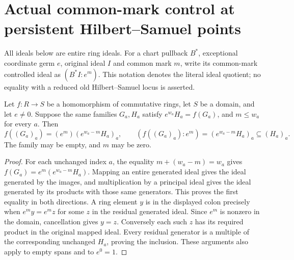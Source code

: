 \section{Actual common-mark control at persistent Hilbert--Samuel points}
\label{sec:hironaka-actual-common-mark-persistent-cosupport}
All ideals below are entire ring ideals. For a chart pullback $B^*$, exceptional coordinate germ $e$, original ideal $I$ and common mark $m$, write its common-mark controlled ideal as $(B^*I:e^m)$. This notation denotes the literal ideal quotient; no equality with a reduced old Hilbert--Samuel locus is asserted.

\begin{theorem}
\label{hir:actual-common-mark-weighted-family-control}
\leanok
Let $f:R\to S$ be a homomorphism of commutative rings, let $S$ be a domain, and let $e\ne0$. Suppose the same families $G_a,H_a$ satisfy $e^{w_a}H_a=f(G_a)$, and $m\le w_a$ for every $a$. Then
\[
 f((G_a)_a)=(e^m)(e^{w_a-m}H_a)_a,
 \qquad (f((G_a)_a):e^m)=(e^{w_a-m}H_a)_a\subseteq(H_a)_a.
\]
The family may be empty, and $m$ may be zero.
\end{theorem}
\begin{proof}
For each unchanged index $a$, the equality $m+(w_a-m)=w_a$ gives $f(G_a)=e^m(e^{w_a-m}H_a)$. Mapping an entire generated ideal gives the ideal generated by the images, and multiplication by a principal ideal gives the ideal generated by its products with those same generators. This proves the first equality in both directions. A ring element $y$ is in the displayed colon precisely when $e^my=e^mz$ for some $z$ in the residual generated ideal. Since $e^m$ is nonzero in the domain, cancellation gives $y=z$. Conversely each such $z$ has its required product in the original mapped ideal. Every residual generator is a multiple of the corresponding unchanged $H_a$, proving the inclusion. These arguments also apply to empty spans and to $e^0=1$.
\end{proof}

